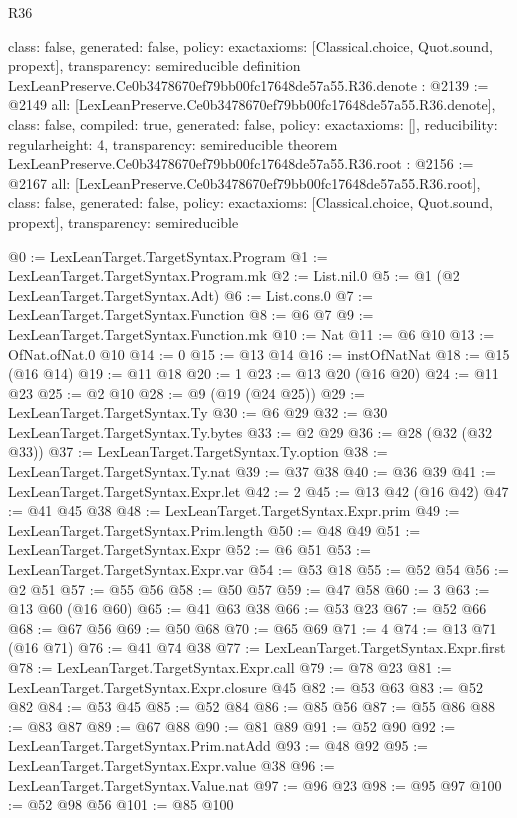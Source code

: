 \begin{lexlean}{R36}
\begin{coremodule}
{  class: false,
  generated: false,
  policy: exact{axioms: [Classical.choice, Quot.sound, propext]},
  transparency: semireducible
}
definition LexLeanPreserve.Ce0b3478670ef79bb00fc17648de57a55.R36.denote : @2139 := @2149 {
  all: [LexLeanPreserve.Ce0b3478670ef79bb00fc17648de57a55.R36.denote],
  class: false,
  compiled: true,
  generated: false,
  policy: exact{axioms: []},
  reducibility: regular{height: 4},
  transparency: semireducible
}
theorem LexLeanPreserve.Ce0b3478670ef79bb00fc17648de57a55.R36.root : @2156 := @2167 {
  all: [LexLeanPreserve.Ce0b3478670ef79bb00fc17648de57a55.R36.root],
  class: false,
  generated: false,
  policy: exact{axioms: [Classical.choice, Quot.sound, propext]},
  transparency: semireducible
}

@0 := LexLeanTarget.TargetSyntax.Program
@1 := LexLeanTarget.TargetSyntax.Program.mk
@2 := List.nil.{0}
@5 := @1 (@2 LexLeanTarget.TargetSyntax.Adt)
@6 := List.cons.{0}
@7 := LexLeanTarget.TargetSyntax.Function
@8 := @6 @7
@9 := LexLeanTarget.TargetSyntax.Function.mk
@10 := Nat
@11 := @6 @10
@13 := OfNat.ofNat.{0} @10
@14 := 0
@15 := @13 @14
@16 := instOfNatNat
@18 := @15 (@16 @14)
@19 := @11 @18
@20 := 1
@23 := @13 @20 (@16 @20)
@24 := @11 @23
@25 := @2 @10
@28 := @9 (@19 (@24 @25))
@29 := LexLeanTarget.TargetSyntax.Ty
@30 := @6 @29
@32 := @30 LexLeanTarget.TargetSyntax.Ty.bytes
@33 := @2 @29
@36 := @28 (@32 (@32 @33))
@37 := LexLeanTarget.TargetSyntax.Ty.option
@38 := LexLeanTarget.TargetSyntax.Ty.nat
@39 := @37 @38
@40 := @36 @39
@41 := LexLeanTarget.TargetSyntax.Expr.let
@42 := 2
@45 := @13 @42 (@16 @42)
@47 := @41 @45 @38
@48 := LexLeanTarget.TargetSyntax.Expr.prim
@49 := LexLeanTarget.TargetSyntax.Prim.length
@50 := @48 @49
@51 := LexLeanTarget.TargetSyntax.Expr
@52 := @6 @51
@53 := LexLeanTarget.TargetSyntax.Expr.var
@54 := @53 @18
@55 := @52 @54
@56 := @2 @51
@57 := @55 @56
@58 := @50 @57
@59 := @47 @58
@60 := 3
@63 := @13 @60 (@16 @60)
@65 := @41 @63 @38
@66 := @53 @23
@67 := @52 @66
@68 := @67 @56
@69 := @50 @68
@70 := @65 @69
@71 := 4
@74 := @13 @71 (@16 @71)
@76 := @41 @74 @38
@77 := LexLeanTarget.TargetSyntax.Expr.first
@78 := LexLeanTarget.TargetSyntax.Expr.call
@79 := @78 @23
@81 := LexLeanTarget.TargetSyntax.Expr.closure @45
@82 := @53 @63
@83 := @52 @82
@84 := @53 @45
@85 := @52 @84
@86 := @85 @56
@87 := @55 @86
@88 := @83 @87
@89 := @67 @88
@90 := @81 @89
@91 := @52 @90
@92 := LexLeanTarget.TargetSyntax.Prim.natAdd
@93 := @48 @92
@95 := LexLeanTarget.TargetSyntax.Expr.value @38
@96 := LexLeanTarget.TargetSyntax.Value.nat
@97 := @96 @23
@98 := @95 @97
@100 := @52 @98 @56
@101 := @85 @100

\end{coremodule}
\end{lexlean}
